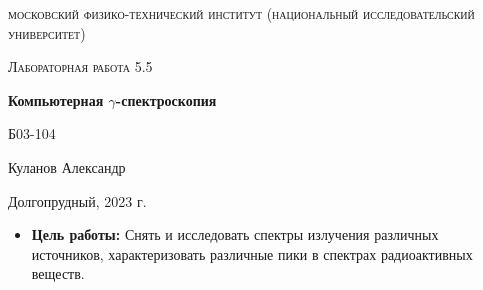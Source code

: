 \documentclass[a4paper, 12pt]{article}
\begin{document}
\begin{titlepage}
	\centering
	\vspace{5cm}
	{\scshape\LARGE московский физико-технический институт (национальный исследовательский университет) \par}
	\vspace{6cm}
	{\scshape\Large Лабораторная работа 5.5 \par}
	{\huge\bfseries Компьютерная $\gamma$-спектроскопия\par}
	\vspace{1cm}
	\vfill
\begin{flushright}
	{\large Б03-104}\par
	\vspace{0.3cm}
	{\LARGE Куланов Александр}
\end{flushright}
	

	\vfill


	Долгопрудный, 2023 г.
\end{titlepage}

\begin{itemize}
	\item \textbf{Цель работы:} Снять и исследовать спектры излучения различных источников, характеризовать различные пики в спектрах радиоактивных веществ.
\end{itemize}
\end{document}
